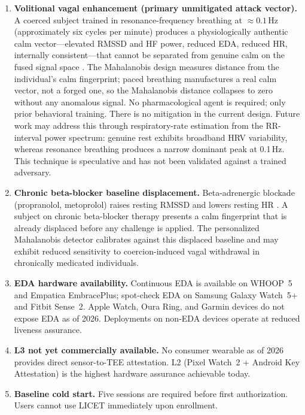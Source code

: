 \documentclass[12pt,a4paper]{article}
\begin{document}
\begin{enumerate}
  \item \textbf{Volitional vagal enhancement (primary unmitigated attack
  vector).} A coerced subject trained in resonance-frequency breathing at
  $\approx 0.1$\,Hz (approximately six cycles per minute) produces a
  physiologically authentic calm vector---elevated RMSSD and HF power, reduced
  EDA, reduced HR, internally consistent---that cannot be separated from
  genuine calm on the fused signal space \cite{laborde2022breathing}. The
  Mahalanobis design measures distance from the individual's calm fingerprint;
  paced breathing manufactures a real calm vector, not a forged one, so the
  Mahalanobis distance collapses to zero without any anomalous signal. No
  pharmacological agent is required; only prior behavioral training. There is
  no mitigation in the current design. Future work may address this through
  respiratory-rate estimation from the RR-interval power spectrum: genuine rest
  exhibits broadband HRV variability, whereas resonance breathing produces a
  narrow dominant peak at 0.1\,Hz. This technique is speculative and has not
  been validated against a trained adversary.

  \item \textbf{Chronic beta-blocker baseline displacement.} Beta-adrenergic
  blockade (propranolol, metoprolol) raises resting RMSSD and lowers resting
  HR \cite{lampert2003betablocker}. A subject on chronic beta-blocker therapy
  presents a calm fingerprint that is already displaced before any challenge
  is applied. The personalized Mahalanobis detector calibrates against this
  displaced baseline and may exhibit reduced sensitivity to coercion-induced
  vagal withdrawal in chronically medicated individuals.

  \item \textbf{EDA hardware availability.} Continuous EDA is available on
  WHOOP~5 and Empatica EmbracePlus; spot-check EDA on Samsung Galaxy Watch~5+
  and Fitbit Sense~2. Apple Watch, Oura Ring, and Garmin devices do not expose
  EDA as of 2026. Deployments on non-EDA devices operate at reduced liveness
  assurance.

  \item \textbf{L3 not yet commercially available.} No consumer wearable as of
  2026 provides direct sensor-to-TEE attestation. L2 (Pixel Watch~2 + Android
  Key Attestation) is the highest hardware assurance achievable today.

  \item \textbf{Baseline cold start.} Five sessions are required before first
  authorization. Users cannot use LICET immediately upon enrollment.


\end{enumerate}
\end{document}
